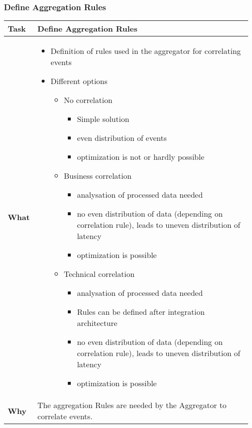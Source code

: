 \subsubsection{Define Aggregation Rules}
\begin{tabularx}{\textwidth}{@{} l X @{}}
	\caption{Define Aggregation Rules} \label{table:ch6_Task_Define_Aggregation_Rules}\\
	\toprule
	\bfseries Task & Define Aggregation Rules\\
	\midrule
	\bfseries What & 
	\begin{itemize}
		\item Definition of rules used in the aggregator for correlating events
		\item Different options
		\begin{itemize}
			\item No correlation
			\begin{itemize}
				\item Simple solution
				\item even distribution of events
				\item optimization is not or hardly possible
			\end{itemize}
			\item Business correlation
			\begin{itemize}
				\item analysation of processed data needed
				\item no even distribution of data (depending on correlation rule), leads to uneven distribution of latency
				\item optimization is possible
			\end{itemize}
			\item Technical correlation
			\begin{itemize}
				\item analysation of processed data needed
				\item Rules can be defined after integration architecture
				\item no even distribution of data (depending on correlation rule), leads to uneven distribution of latency
				\item optimization is possible
			\end{itemize}
		\end{itemize}
	\end{itemize}
	\\
	\midrule
	\bfseries Why & The aggregation Rules are needed by the Aggregator to correlate events.\\

\end{tabularx}
